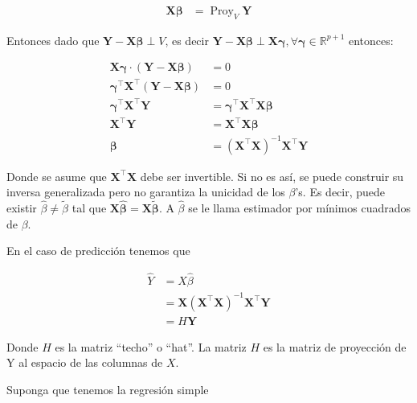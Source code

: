 \documentclass[
  12pt,
]{book}
\begin{document}
\begin{align*}
\boldsymbol{X}\boldsymbol{\beta}
 &= \operatorname{Proy}_{V} \boldsymbol{Y}
\end{align*}

Entonces dado que
\(\boldsymbol{Y}-\boldsymbol{X}\boldsymbol{\beta} \perp V\), es decir
\(\boldsymbol{Y}-\boldsymbol{X}\boldsymbol{\beta} \perp \boldsymbol{X}\boldsymbol{\gamma}, \forall \boldsymbol{\gamma} \in \mathbb{R}^{p+1}\)
entonces:

\begin{align*}
 \boldsymbol{X}\boldsymbol{\gamma} \cdot \left(\boldsymbol{Y}-\boldsymbol{X}\boldsymbol{\beta}\right)  &=  0 \\
 \boldsymbol{\gamma}^{\top}\boldsymbol{X}^{\top}(\boldsymbol{Y}-\boldsymbol{X}\boldsymbol{\beta}) &=  0 \\
 \boldsymbol{\gamma}^{\top}\boldsymbol{X}^{\top}\boldsymbol{Y} &= \boldsymbol{\gamma}^{\top} \boldsymbol{X}^{\top} \boldsymbol{X}\boldsymbol{\beta}  \\
  \boldsymbol{X}^{\top}\boldsymbol{Y} &=  \boldsymbol{X}^{\top} \boldsymbol{X}\boldsymbol{\beta}  \\
  \boldsymbol{\beta}  &=  (\boldsymbol{X}^{\top} \boldsymbol{X})^{-1} \boldsymbol{X}^{\top}\boldsymbol{Y} 
\end{align*}

Donde se asume que \(\boldsymbol{X}^{\top} \boldsymbol{X}\) debe ser
invertible. Si no es así, se puede construir su inversa generalizada
pero no garantiza la unicidad de los \(\beta\)'s. Es decir, puede
existir \(\hat{\beta} \neq \tilde{\beta}\) tal que
\(\boldsymbol{X}\boldsymbol{\hat{\beta}} = \boldsymbol{X}\boldsymbol{\tilde{\beta}}\).
A \(\hat \beta\) se le llama estimador por mínimos cuadrados de
\(\beta\).

En el caso de predicción tenemos que

\begin{align*}
\hat{Y} &=  X\hat \beta \\
&= \boldsymbol{X}(\boldsymbol{X}^{\top} \boldsymbol{X})^{-1} \boldsymbol{X}^{\top}\boldsymbol{Y} \\
&=  H \boldsymbol{Y} 
\end{align*}

Donde \(H\) es la matriz ``techo'' o ``hat''. La matriz \(H\) es la
matriz de proyección de Y al espacio de las columnas de \(X\).

\leavevmode{}%
Suponga que tenemos la regresión simple
\end{document}
